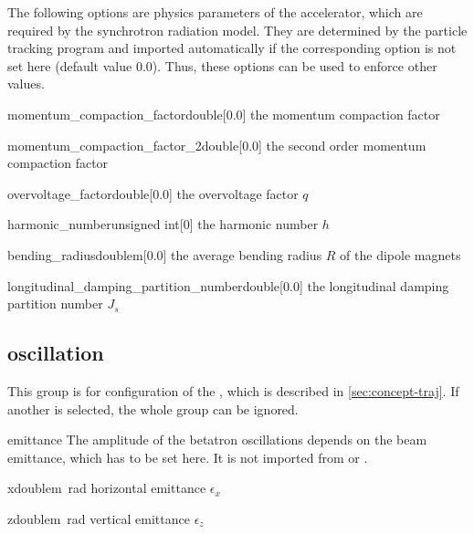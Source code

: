 \documentclass[a4paper]{scrartcl}
\begin{document}
The following options are physics parameters of the accelerator, which are required by the
synchrotron radiation model. They are determined by the particle tracking program and
imported automatically if the corresponding option is not set here (default value
\num{0.0}). Thus, these options can be used to enforce other values.\\[2mm]

\begin{configdoc}{momentum_compaction_factor}{double}{}[0.0]
  the momentum compaction factor \alphac
\end{configdoc}

\begin{configdoc}{momentum_compaction_factor_2}{double}{}[0.0]
   the second order momentum compaction factor \alphactwo
\end{configdoc}

\begin{configdoc}{overvoltage_factor}{double}{}[0.0]
  the overvoltage factor $q$
\end{configdoc}

\begin{configdoc}{harmonic_number}{unsigned int}{}[0]
  the harmonic number $h$
\end{configdoc}

\begin{configdoc}{bending_radius}{double}{\si{\m}}[0.0]
  the average bending radius $R$ of the dipole magnets
\end{configdoc}

\begin{configdoc}{longitudinal_damping_partition_number}{double}{}[0.0]
  the longitudinal damping partition number $J_s$
\end{configdoc}


\subsection{oscillation}
\label{sec:config-oscil}
This group is for configuration of the 
, which is described in \cref{sec:concept-traj}. If another
 is selected, the whole group can be ignored.


\begin{configdocgroup}{emittance}
  The amplitude of the betatron oscillations depends on the beam emittance, which has to
  be set here. It is not imported from \ele or \madx.\\[2mm]
  
  \begin{configdoc}{x}{double}{\si{\m\radian}}
  horizontal emittance $\epsilon_x$
  \end{configdoc}
  \begin{configdoc}{z}{double}{\si{\m\radian}}
    vertical emittance $\epsilon_z$
  \end{configdoc}
\end{configdocgroup}
\end{document}
